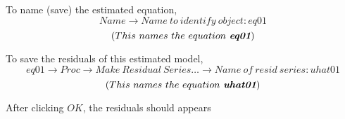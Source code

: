 \documentclass[12pt]{report}
\begin{document}
\vspace{-\baselineskip}
\noindent To name (save) the estimated equation,
$$Name \to Name\ to\ identify\ object: eq01$$
$$(This\ names\ the\ equation\ \textit{\textbf{eq01}})$$
\begin{figure}[H]
	\centering
\end{figure}
\vspace{-\baselineskip}
\begin{figure}[H]
	\centering
\end{figure}
\vspace{-\baselineskip}
\noindent To save the residuals of this estimated model,
$$eq01 \to Proc \to Make\ Residual\ Series \dots \to Name\ of\ resid\ series: uhat01$$
$$(This\ names\ the\ equation\ \textit{\textbf{uhat01}})$$
\begin{figure}[H]
	\centering
\end{figure}
\vspace{-\baselineskip}
\begin{figure}[H]
	\centering
\end{figure}
\vspace{-\baselineskip}
\noindent After clicking $OK$, the residuals should appears
\begin{figure}[H]
	\centering
\end{figure}
\vspace{-\baselineskip}
\newpage
\justify
\end{document}
